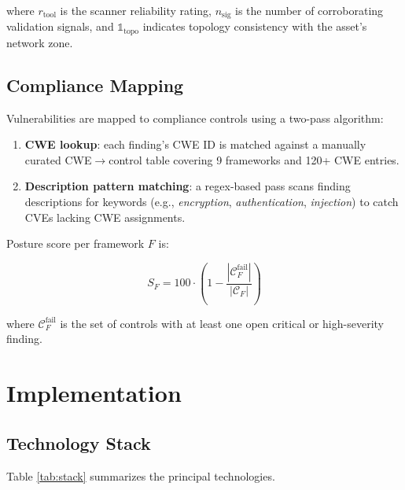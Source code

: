 \documentclass[conference]{IEEEtran}
\begin{document}
where $r_{\text{tool}}$ is the scanner reliability rating, $n_{\text{sig}}$ is the number of corroborating validation signals, and $\mathbb{1}_{\text{topo}}$ indicates topology consistency with the asset's network zone.

\subsection{Compliance Mapping}

Vulnerabilities are mapped to compliance controls using a two-pass algorithm:

\begin{enumerate}
  \item \textbf{CWE lookup}: each finding's CWE ID is matched against a manually curated CWE$\rightarrow$control table covering 9 frameworks and 120+ CWE entries.
  \item \textbf{Description pattern matching}: a regex-based pass scans finding descriptions for keywords (e.g., \textit{encryption}, \textit{authentication}, \textit{injection}) to catch CVEs lacking CWE assignments.
\end{enumerate}

Posture score per framework $F$ is:

\begin{equation}
  S_F = 100 \cdot \left(1 - \frac{|\mathcal{C}_F^{\text{fail}}|}{|\mathcal{C}_F|}\right)
\end{equation}

where $\mathcal{C}_F^{\text{fail}}$ is the set of controls with at least one open critical or high-severity finding.

\section{Implementation}

\subsection{Technology Stack}

Table \ref{tab:stack} summarizes the principal technologies.
\end{document}

